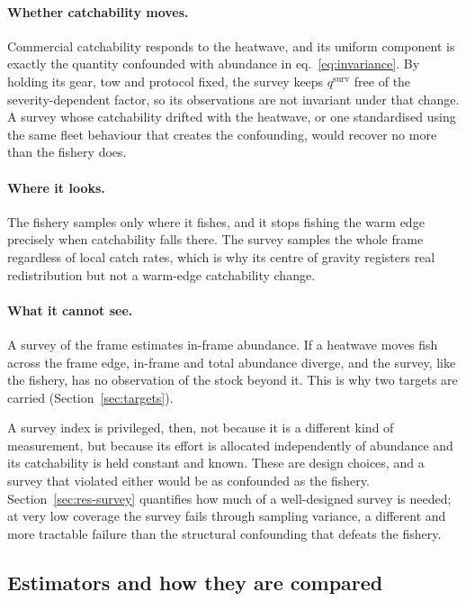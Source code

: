 \documentclass[11pt,a4paper]{article}
\newcommand{\vt}[1]{\text{#1}}
\begin{document}
\paragraph{Whether catchability moves.} Commercial catchability responds to the heatwave, and its uniform component is exactly the quantity confounded with abundance in eq.~\eqref{eq:invariance}. By holding its gear, tow and protocol fixed, the survey keeps $q^{\vt{surv}}$ free of the severity-dependent factor, so its observations are not invariant under that change. A survey whose catchability drifted with the heatwave, or one standardised using the same fleet behaviour that creates the confounding, would recover no more than the fishery does.

\paragraph{Where it looks.} The fishery samples only where it fishes, and it stops fishing the warm edge precisely when catchability falls there. The survey samples the whole frame regardless of local catch rates, which is why its centre of gravity registers real redistribution but not a warm-edge catchability change.

\paragraph{What it cannot see.} A survey of the frame estimates in-frame abundance. If a heatwave moves fish across the frame edge, in-frame and total abundance diverge, and the survey, like the fishery, has no observation of the stock beyond it. This is why two targets are carried (Section~\ref{sec:targets}).

A survey index is privileged, then, not because it is a different kind of measurement, but because its effort is allocated independently of abundance and its catchability is held constant and known. These are design choices, and a survey that violated either would be as confounded as the fishery. Section~\ref{sec:res-survey} quantifies how much of a well-designed survey is needed; at very low coverage the survey fails through sampling variance, a different and more tractable failure than the structural confounding that defeats the fishery.

\subsection{Estimators and how they are compared}
\label{sec:estimators}
\end{document}
